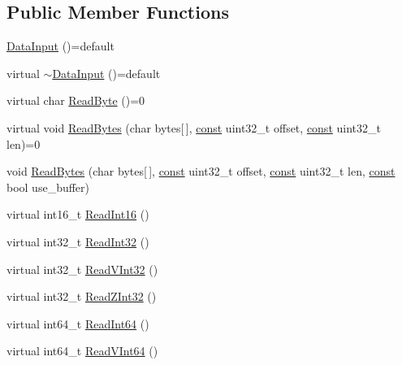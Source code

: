 \subsection*{Public Member Functions}
\begin{DoxyCompactItemize}
\item 
\mbox{\hyperlink{classlucene_1_1core_1_1store_1_1DataInput_ab15cf10657835217ba3e27aec0b2cb57}{Data\+Input}} ()=default
\item 
virtual \mbox{\hyperlink{classlucene_1_1core_1_1store_1_1DataInput_a5f43d835939fa7834857e5b8e60ec3f3}{$\sim$\+Data\+Input}} ()=default
\item 
virtual char \mbox{\hyperlink{classlucene_1_1core_1_1store_1_1DataInput_a60f2550ccbe4decde30f3773dc53c0ef}{Read\+Byte}} ()=0
\item 
virtual void \mbox{\hyperlink{classlucene_1_1core_1_1store_1_1DataInput_aa5f24102b9b50a190bcb7a8edb82ea2d}{Read\+Bytes}} (char bytes\mbox{[}$\,$\mbox{]}, \mbox{\hyperlink{ZlibCrc32_8h_a2c212835823e3c54a8ab6d95c652660e}{const}} uint32\+\_\+t offset, \mbox{\hyperlink{ZlibCrc32_8h_a2c212835823e3c54a8ab6d95c652660e}{const}} uint32\+\_\+t len)=0
\item 
void \mbox{\hyperlink{classlucene_1_1core_1_1store_1_1DataInput_aa5e0f36d6de9b544300f0519040171ae}{Read\+Bytes}} (char bytes\mbox{[}$\,$\mbox{]}, \mbox{\hyperlink{ZlibCrc32_8h_a2c212835823e3c54a8ab6d95c652660e}{const}} uint32\+\_\+t offset, \mbox{\hyperlink{ZlibCrc32_8h_a2c212835823e3c54a8ab6d95c652660e}{const}} uint32\+\_\+t len, \mbox{\hyperlink{ZlibCrc32_8h_a2c212835823e3c54a8ab6d95c652660e}{const}} bool use\+\_\+buffer)
\item 
virtual int16\+\_\+t \mbox{\hyperlink{classlucene_1_1core_1_1store_1_1DataInput_aeb6d3697693dac6f16a2df5e3f50091d}{Read\+Int16}} ()
\item 
virtual int32\+\_\+t \mbox{\hyperlink{classlucene_1_1core_1_1store_1_1DataInput_a1be184e66e0bf1f9f948e758429d1ed5}{Read\+Int32}} ()
\item 
virtual int32\+\_\+t \mbox{\hyperlink{classlucene_1_1core_1_1store_1_1DataInput_aa4539e00fc3d2735814a6656455ac74b}{Read\+V\+Int32}} ()
\item 
virtual int32\+\_\+t \mbox{\hyperlink{classlucene_1_1core_1_1store_1_1DataInput_aff75dca4d1962e427209f75c0ff04578}{Read\+Z\+Int32}} ()
\item 
virtual int64\+\_\+t \mbox{\hyperlink{classlucene_1_1core_1_1store_1_1DataInput_a60310365f3d2d4e7b9dda79b00cc355b}{Read\+Int64}} ()
\item 
virtual int64\+\_\+t \mbox{\hyperlink{classlucene_1_1core_1_1store_1_1DataInput_a71781c16e8c3ebf21dcafb37cee5bcc6}{Read\+V\+Int64}} ()

\end{DoxyCompactItemize}
